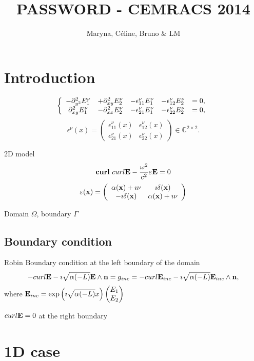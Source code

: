 \documentclass{article}
\title{PASSWORD - CEMRACS 2014}
\author{Maryna, C\'eline, Bruno \& LM}
\date{}
\newcommand{\bs}{\left\{}
\newcommand{\es}{\right.}
\newcommand{\ba}{\begin{array}}
\newcommand{\ea}{\end{array}}
\newcommand{\be}{\begin{equation}}
\newcommand{\ee}{\end{equation}}
\newcommand{\x}{{\bf x}}
\newcommand{\E}{{\bf E}}
\newcommand{\n}{{\bf n}}
\newcommand{\eps}{{\bf \varepsilon}}
\begin{document}
\maketitle


\section{Introduction}


\begin{equation} \label{eq:00}
\bs
\ba{ccccc}
-\partial^2_{y^2}E_{1}^\nu & +\partial^2_{xy}E_{2}^\nu & -\epsilon_{11}^\nu
 E_{1}^\nu & -\epsilon_{12}^\nu E_{2}^\nu & =0, \cr
\partial^2_{xy}E_{1}^\nu & -\partial^2_{xx}E_{2}^\nu & -\epsilon_{21}
^\nu
E_{1}^\nu & -\epsilon_{22}^\nu E_{2}^\nu & =0,
\ea
\es
\end{equation}
\be \label{eq:epsilonmu}
 \epsilon^\nu(x) =
\left(
\begin{array}{cc}
\epsilon_{11} ^\nu(x)& \epsilon_{12} ^\nu(x)\\
\epsilon_{21}^\nu(x) & \epsilon_{22}^\nu(x)
\end{array}
\right)
\in \mathbb C^{2\times 2}
.
\ee

2D model
\be
{\bf curl} \ curl \E - \frac{\omega^2}{c^2} \varepsilon \E= 0
\ee
\be
\eps (\x)= 
\left(
\begin{array}{cc}
\alpha(\x) + \imath \nu& \imath \delta (\x)\\
-\imath \delta (\x) & \alpha(\x) +\imath \nu
\end{array}
\right)
\ee

Domain $\Omega$, boundary $\Gamma$

\subsection{Boundary condition}
Robin Boundary condition at the left boundary of the domain
\be
-curl \E -\imath \sqrt{\alpha(-{ L})}\E \wedge \n = g_{inc} = -curl \E_{inc} -\imath \sqrt{\alpha(-{ L})}\E_{inc} \wedge \n,
\ee
where  $\E_{inc} = \exp \left(\imath \sqrt{\alpha(-L)}x\right)\begin{pmatrix} E_1\\ E_2 \end{pmatrix}$

$curl \E = 0$ at the right boundary


\section{1D case}
\end{document}
